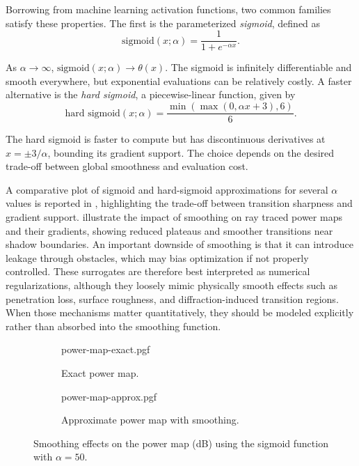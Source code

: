Borrowing from machine learning activation functions, two common families satisfy these properties. The first is the parameterized \emph{sigmoid}, defined as
\begin{equation}
\text{sigmoid}(x;\alpha) = \frac{1}{1 + e^{-\alpha x}}.
\end{equation}

As $\alpha\rightarrow\infty$, $\text{sigmoid}(x;\alpha)\rightarrow\theta(x)$. The sigmoid is infinitely differentiable and smooth everywhere, but exponential evaluations can be relatively costly. A faster alternative is the \emph{hard sigmoid}, a piecewise-linear function, given by
\begin{equation}
\text{hard sigmoid}(x;\alpha) = \frac{\min(\max(0, \alpha x+3), 6)}{6}.
\end{equation}

The hard sigmoid is faster to compute but has discontinuous derivatives at $x=\pm3/\alpha$, bounding its gradient support. The choice depends on the desired trade-off between global smoothness and evaluation cost.

A comparative plot of sigmoid and hard-sigmoid approximations for several $\alpha$ values is reported in , highlighting the trade-off between transition sharpness and gradient support.  illustrate the impact of smoothing on ray traced power maps and their gradients, showing reduced plateaus and smoother transitions near shadow boundaries. An important downside of smoothing is that it can introduce leakage through obstacles, which may bias optimization if not properly controlled. These surrogates are therefore best interpreted as numerical regularizations, although they loosely mimic physically smooth effects such as penetration loss, surface roughness, and diffraction-induced transition regions. When those mechanisms matter quantitatively, they should be modeled explicitly rather than absorbed into the smoothing function.

\begin{figure}
\centering
\begin{subfigure}[t]{0.49\contentwidth}
\centering
{power-map-exact.pgf}
\caption{Exact power map.}
\end{subfigure}
\begin{subfigure}[t]{0.49\contentwidth}
\centering
{power-map-approx.pgf}
\caption{Approximate power map with smoothing.}
\end{subfigure}
\caption{Smoothing effects on the power map (\unit{\dB}) using the sigmoid function with $\alpha=50$.}
\end{figure}

